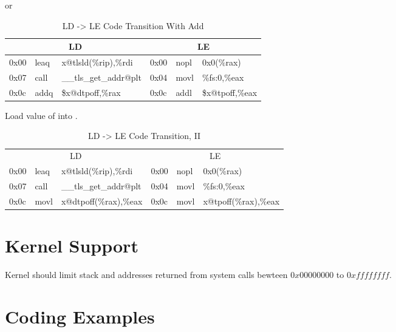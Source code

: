 \begin{description}
or

\begin{table}[H]
\Hrule
\caption{LD -> LE Code Transition With Add}
\begin{center}
\code\small{
\begin{tabular}{lll|lll}
\multicolumn{3}{c}{LD} & \multicolumn{3}{c}{LE} \\
\hline
0x00 & leaq  & x@tlsld(\%rip),\%rdi	& 0x00 & nopl & 0x0(\%rax) \\
0x07 & call  & \_\_tls\_get\_addr@plt	& 0x04 & movl & \%fs:0,\%eax\\
0x0c & addq  & \$x@dtpoff,\%rax		& 0x0c & addl & \$x@tpoff,\%eax\\
\end{tabular}
}
\end{center}
\Hrule
\end{table}

\item[\textindex{Local Dynamic To Local Exec, II}]
  Load value of  into .

\begin{table}[H]
\Hrule
\caption{LD -> LE Code Transition, II}
\begin{center}
\code\small{
\begin{tabular}{lll|lll}
\multicolumn{3}{c}{LD} & \multicolumn{3}{c}{LE} \\
0x00 & leaq  & x@tlsld(\%rip),\%rdi	& 0x00 & nopl & 0x0(\%rax) \\
0x07 & call  & \_\_tls\_get\_addr@plt	& 0x04 & movl & \%fs:0,\%eax\\
0x0c & movl  & x@dtpoff(\%rax),\%eax	& 0x0c & movl & x@tpoff(\%rax),\%eax\\
\hline
\end{tabular}
}
\end{center}
\Hrule
\end{table}

\end{description}

\section{Kernel Support}
Kernel should limit stack and addresses returned from system calls
bewteen $0x00000000$ to $0xffffffff$.

\section{Coding Examples}

